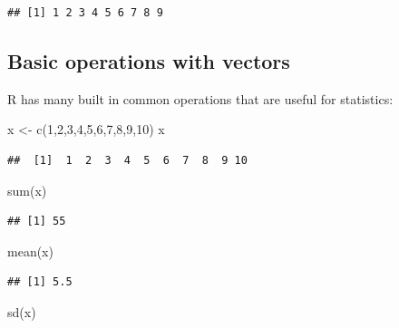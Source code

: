 \documentclass[
]{article}
\newenvironment{Shaded}{\begin{snugshade}}{\end{snugshade}}
\newcommand{\DecValTok}[1]{\textcolor[rgb]{0.00,0.00,0.81}{#1}}
\newcommand{\FunctionTok}[1]{\textcolor[rgb]{0.00,0.00,0.00}{#1}}
\newcommand{\NormalTok}[1]{#1}
\newcommand{\OtherTok}[1]{\textcolor[rgb]{0.56,0.35,0.01}{#1}}
\theoremstyle{definition}
\theoremstyle{definition}
\theoremstyle{definition}
\theoremstyle{remark}
\begin{document}
\begin{verbatim}
## [1] 1 2 3 4 5 6 7 8 9
\end{verbatim}

\hypertarget{basic-operations-with-vectors}{%
\subsection{Basic operations with vectors}\label{basic-operations-with-vectors}}

R has many built in common operations that are useful for statistics:

\begin{Shaded}
\begin{Highlighting}[]
\NormalTok{x }\OtherTok{\textless{}{-}} \FunctionTok{c}\NormalTok{(}\DecValTok{1}\NormalTok{,}\DecValTok{2}\NormalTok{,}\DecValTok{3}\NormalTok{,}\DecValTok{4}\NormalTok{,}\DecValTok{5}\NormalTok{,}\DecValTok{6}\NormalTok{,}\DecValTok{7}\NormalTok{,}\DecValTok{8}\NormalTok{,}\DecValTok{9}\NormalTok{,}\DecValTok{10}\NormalTok{)}
\NormalTok{x}
\end{Highlighting}
\end{Shaded}

\begin{verbatim}
##  [1]  1  2  3  4  5  6  7  8  9 10
\end{verbatim}

\begin{Shaded}
\begin{Highlighting}[]
\FunctionTok{sum}\NormalTok{(x)}
\end{Highlighting}
\end{Shaded}

\begin{verbatim}
## [1] 55
\end{verbatim}

\begin{Shaded}
\begin{Highlighting}[]
\FunctionTok{mean}\NormalTok{(x)}
\end{Highlighting}
\end{Shaded}

\begin{verbatim}
## [1] 5.5
\end{verbatim}

\begin{Shaded}
\begin{Highlighting}[]
\FunctionTok{sd}\NormalTok{(x)}
\end{Highlighting}
\end{Shaded}
\end{document}
